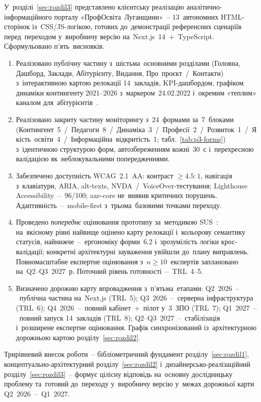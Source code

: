 У~розділі~\ref{sec:rozdil3} представлено клієнтську реалізацію аналітично-інформаційного порталу «ПрофОсвіта~Луганщини»~-- 13~автономних HTML-сторінок із~CSS/JS-логікою, готових до~демонстрації референсних сценаріїв перед~переходом у~виробничу версію на~Next.js~14~+~TypeScript. Сформульовано п'ять~висновків.

\begin{enumerate}
    \item Реалізовано публічну частину з~шістьма~основними розділами (Головна, Дашборд, Заклади, Абітурієнту, Видання, Про~проєкт~/~Контакти) з~інтерактивною картою релокації 14~закладів, KPI-дашбордом, графіком динаміки контингенту 2021--2026 з~маркером~24.02.2022 і~окремим «теплим» каналом для~абітурієнтів~\cite{NMTsPTO2025}.

    \item Реалізовано закриту частину моніторингу з~24~формами за~7~блоками (Контингент~5~/~Педагоги~8~/~Динаміка~3~/~Професії~2~/~Розвиток~1~/~Якість~освіти~4~/~Інформаційна~відкритість~1; табл.~\ref{tab:p3-forms}) з~ідентичною структурою форм, автозбереженням кожні~30~с і~перехресною валідацією як~неблокувальними попередженнями.

    \item Забезпечено доступність WCAG~2.1~AA: контраст $\geq 4.5{:}1$, навігація з~клавіатури, ARIA, alt-texts, NVDA~/~VoiceOver-тестування; Lighthouse Accessibility~--~96/100; axe-core не~виявив критичних порушень. Адаптивність~--~mobile-first з~трьома~базовими точками переходу.

    \item Проведено \emph{попереднє} оцінювання прототипу за~методикою SUS~\cite{SauroLewis2016}: на~якісному рівні найвище оцінено карту релокації і~кольорову семантику статусів, найнижче~--~ергономіку форми~6.2 і~зрозумілість логіки крос-валідації; конкретні архітектурні зауваження увійшли до~плану виправлень. Повномасштабне експертне оцінювання з~$n\geq 10$~експертів заплановано на~Q2--Q3~2027~р. Поточний рівень готовності~--~TRL~4--5.

    \item Визначено дорожню карту впровадження з~п'ятьма~етапами: Q2~2026~--~публічна частина на~Next.js (TRL~5); Q3~2026~--~серверна інфраструктура (TRL~6); Q4~2026~--~повний кабінет~+~пілот у~3~ЗПО (TRL~7); Q1~2027~--~повний запуск 14~закладів (TRL~8); Q2--Q3~2027~--~стабілізація і~розширене експертне оцінювання. Графік синхронізований із~архітектурною дорожньою картою розділу~\ref{sec:rozdil2}.
\end{enumerate}

Трирівневий внесок роботи~-- бібліометричний фундамент розділу~\ref{sec:rozdil1}, концептуально-архітектурний розділу~\ref{sec:rozdil2} і~дизайнерсько-реалізаційний розділу~\ref{sec:rozdil3}~-- формує цілісну відповідь на~основну дослідницьку проблему та~готовий до~переходу у~виробничу версію у~межах дорожньої карти Q2~2026~--~Q1~2027.

\clearpage
